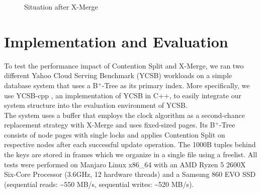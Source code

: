 \documentclass[acmlarge,nonacm,dvipsnames]{acmart}
\begin{document}
\begin{figure}
\begin{minipage}{0.5\textwidth}
\caption{Situation after X-Merge}
\label{fig:after_x_merge}
\end{minipage}
\end{figure}
\section{Implementation and Evaluation}
To test the performance impact of Contention Split and X-Merge, we ran two different Yahoo Cloud Serving Benchmark (YCSB) \cite{ycsb} workloads on a simple database system that uses a B$^+$-Tree as its primary index. More specifically, we use YCSB-cpp \cite{ycsb_cpp}, an implementation of YCSB in C++, to easily integrate our system structure into the evaluation environment of YCSB.\\
The system uses a buffer that employs the clock algorithm \cite{clock_algo} as a second-chance replacement strategy with X-Merge and uses fixed-sized pages. Its B$^+$-Tree consists of node pages with single locks and applies Contention Split on respective nodes after each successful update operation. The 1000B tuples behind the keys are stored in frames which we organize in a single file using a freelist. All tests were performed on  Manjaro Linux x86\_64 with an AMD Ryzen 5 2600X Six-Core Processor (3.6GHz, 12 hardware threads) and a Samsung 860 EVO SSD (sequential reads: \textasciitilde550 MB/s, sequential writes: \textasciitilde520 MB/s).\\
\end{document}
